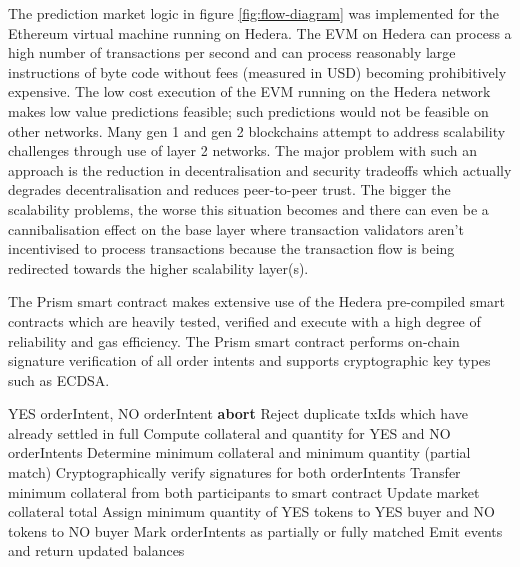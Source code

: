 \documentclass[11pt,a4paper]{article}
\begin{document}
The prediction market logic in figure \ref{fig:flow-diagram} was implemented for the Ethereum virtual machine running on Hedera. The EVM on Hedera can process a high number of transactions per second and can process reasonably large instructions of byte code without fees (measured in USD) becoming prohibitively expensive. The low cost execution of the EVM running on the Hedera network makes low value predictions feasible; such predictions would not be feasible on other networks. Many gen 1 and gen 2 blockchains attempt to address scalability challenges through use of layer 2 networks. The major problem with such an approach is the reduction in decentralisation and security tradeoffs which actually degrades decentralisation and reduces peer-to-peer trust. The bigger the scalability problems, the worse this situation becomes and there can even be a cannibalisation effect on the base layer where transaction validators aren't incentivised to process transactions because the transaction flow is being redirected towards the higher scalability layer(s).

The Prism smart contract makes extensive use of the Hedera pre-compiled smart contracts which are heavily tested, verified and execute with a high degree of reliability and gas efficiency. The Prism smart contract performs on-chain signature verification of all order intents and supports cryptographic key types such as ECDSA.

\begin{algorithm}[H]
\caption{Atomic Order Matching}
\begin{algorithmic}[1]
\Require YES orderIntent, NO orderIntent
    \State \textbf{abort}
\EndIf
\State Reject duplicate txIds which have already settled in full
\State Compute collateral and quantity for YES and NO orderIntents
\State Determine minimum collateral and minimum quantity (partial match)
\State Cryptographically verify signatures for both orderIntents
\State Transfer minimum collateral from both participants to smart contract
\State Update market collateral total
\State Assign minimum quantity of YES tokens to YES buyer and NO tokens to NO buyer
\State Mark orderIntents as partially or fully matched
\State Emit events and return updated balances
\end{algorithmic}
\end{algorithm}

\end{document}
